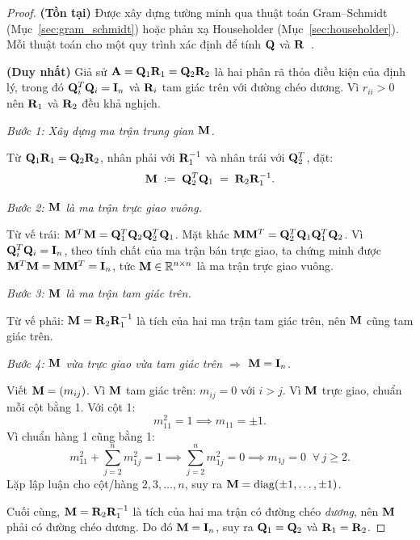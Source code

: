\begin{proof}
\textbf{(Tồn tại)} Được xây dựng tường minh qua thuật toán Gram--Schmidt
(Mục~\ref{sec:gram_schmidt}) hoặc phản xạ Householder (Mục~\ref{sec:householder}).
Mỗi thuật toán cho một quy trình xác định để tính $\mathbf{Q}$ và $\mathbf{R}$~\cite{trefethen1997}.

\medskip
\textbf{(Duy nhất)} Giả sử $\mathbf{A} = \mathbf{Q}_1\mathbf{R}_1 = \mathbf{Q}_2\mathbf{R}_2$ là
hai phân rã thỏa điều kiện của định lý, trong đó $\mathbf{Q}_i^T\mathbf{Q}_i = \mathbf{I}_n$
và $\mathbf{R}_i$ tam giác trên với đường chéo dương. Vì $r_{ii} > 0$ nên $\mathbf{R}_1$
và $\mathbf{R}_2$ đều khả nghịch.

\medskip
\noindent\textit{Bước 1: Xây dựng ma trận trung gian $\mathbf{M}$.}

Từ $\mathbf{Q}_1\mathbf{R}_1 = \mathbf{Q}_2\mathbf{R}_2$, nhân phải với $\mathbf{R}_1^{-1}$
và nhân trái với $\mathbf{Q}_2^T$, đặt:
\[
    \mathbf{M} \;\mathrel{\mathop:}=\; \mathbf{Q}_2^T\mathbf{Q}_1 \;=\; \mathbf{R}_2\mathbf{R}_1^{-1}.
\]

\noindent\textit{Bước 2: $\mathbf{M}$ là ma trận trực giao vuông.}

Từ vế trái: $\mathbf{M}^T\mathbf{M} = \mathbf{Q}_1^T\mathbf{Q}_2\mathbf{Q}_2^T\mathbf{Q}_1$.
Mặt khác $\mathbf{M}\mathbf{M}^T = \mathbf{Q}_2^T\mathbf{Q}_1\mathbf{Q}_1^T\mathbf{Q}_2$.
Vì $\mathbf{Q}_i^T\mathbf{Q}_i = \mathbf{I}_n$, theo tính chất của ma trận bán trực giao,
ta chứng minh được $\mathbf{M}^T\mathbf{M} = \mathbf{M}\mathbf{M}^T = \mathbf{I}_n$,
tức $\mathbf{M} \in \mathbb{R}^{n \times n}$ là ma trận trực giao vuông.

\medskip
\noindent\textit{Bước 3: $\mathbf{M}$ là ma trận tam giác trên.}

Từ vế phải: $\mathbf{M} = \mathbf{R}_2\mathbf{R}_1^{-1}$ là tích của hai ma trận tam giác
trên, nên $\mathbf{M}$ cũng tam giác trên.

\medskip
\noindent\textit{Bước 4: $\mathbf{M}$ vừa trực giao vừa tam giác trên $\Rightarrow$ $\mathbf{M} = \mathbf{I}_n$.}

Viết $\mathbf{M} = (m_{ij})$. Vì $\mathbf{M}$ tam giác trên: $m_{ij} = 0$ với $i > j$.
Vì $\mathbf{M}$ trực giao, chuẩn mỗi cột bằng 1. Với cột 1:
\[
    m_{11}^2 = 1 \implies m_{11} = \pm 1.
\]
Vì chuẩn hàng 1 cũng bằng 1:
\[
    m_{11}^2 + \sum_{j=2}^{n} m_{1j}^2 = 1
    \implies \sum_{j=2}^{n} m_{1j}^2 = 0
    \implies m_{1j} = 0 \;\;\forall\, j \geq 2.
\]
Lặp lập luận cho cột/hàng $2, 3, \ldots, n$, suy ra $\mathbf{M} = \operatorname{diag}(\pm 1, \ldots, \pm 1)$.

Cuối cùng, $\mathbf{M} = \mathbf{R}_2\mathbf{R}_1^{-1}$ là tích của hai ma trận có đường chéo
\emph{dương}, nên $\mathbf{M}$ phải có đường chéo dương. Do đó $\mathbf{M} = \mathbf{I}_n$,
suy ra $\mathbf{Q}_1 = \mathbf{Q}_2$ và $\mathbf{R}_1 = \mathbf{R}_2$.
\end{proof}

